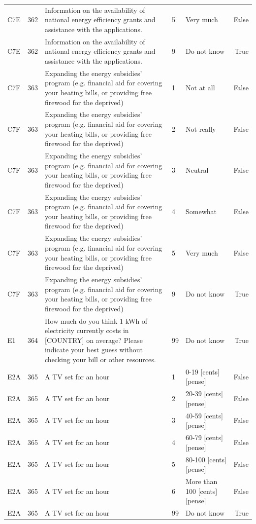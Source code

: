 \begin{tabular}{lrlllr}
C7E & 362 & Information on the availability of national energy efficiency grants and assistance with the applications. & 5 & Very much & False \\
C7E & 362 & Information on the availability of national energy efficiency grants and assistance with the applications. & 9 & Do not know & True \\
C7F & 363 & Expanding the energy subsidies’ program (e.g. financial aid for covering your heating bills, or providing free firewood for the deprived) & 1 & Not at all & False \\
C7F & 363 & Expanding the energy subsidies’ program (e.g. financial aid for covering your heating bills, or providing free firewood for the deprived) & 2 & Not really & False \\
C7F & 363 & Expanding the energy subsidies’ program (e.g. financial aid for covering your heating bills, or providing free firewood for the deprived) & 3 & Neutral & False \\
C7F & 363 & Expanding the energy subsidies’ program (e.g. financial aid for covering your heating bills, or providing free firewood for the deprived) & 4 & Somewhat & False \\
C7F & 363 & Expanding the energy subsidies’ program (e.g. financial aid for covering your heating bills, or providing free firewood for the deprived) & 5 & Very much & False \\
C7F & 363 & Expanding the energy subsidies’ program (e.g. financial aid for covering your heating bills, or providing free firewood for the deprived) & 9 & Do not know & True \\
E1 & 364 & How much do you think 1 kWh of electricity currently costs in [COUNTRY] on average? Please indicate your best guess without checking your bill or other resources. & 99 & Do not know & True \\
E2A & 365 & A TV set for an hour & 1 & 0-19 [cents] [pense] & False \\
E2A & 365 & A TV set for an hour & 2 & 20-39 [cents] [pense] & False \\
E2A & 365 & A TV set for an hour & 3 & 40-59 [cents] [pense] & False \\
E2A & 365 & A TV set for an hour & 4 & 60-79 [cents] [pense] & False \\
E2A & 365 & A TV set for an hour & 5 & 80-100 [cents] [pense] & False \\
E2A & 365 & A TV set for an hour & 6 & More than 100 [cents] [pense] & False \\
E2A & 365 & A TV set for an hour & 99 & Do not know & True \\

\end{tabular}
